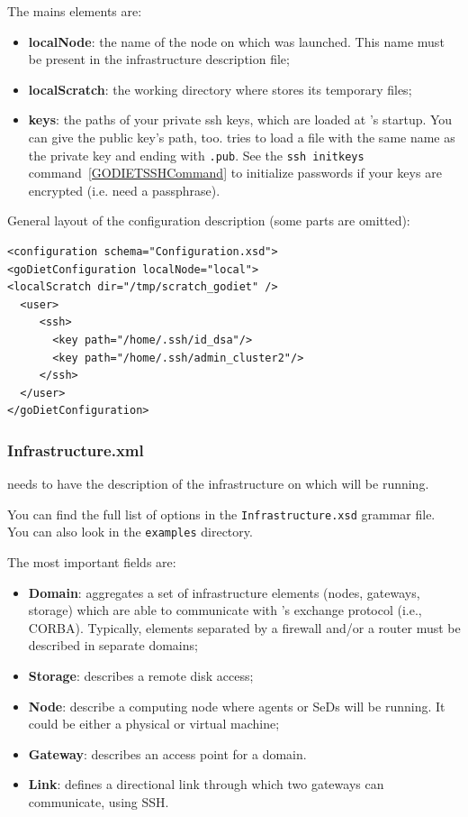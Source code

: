 \vspace{1cm}
The mains elements are:
\begin{itemize}
\item \textbf{localNode}: the name of the node on which \godiet was launched. This name must be present in the infrastructure description file;
\item \textbf{localScratch}: the working directory where \godiet stores its temporary files;
\item \textbf{keys}: the paths of your private ssh keys, which are loaded at \godiet's startup. You can give the public key's path, too. \godiet tries to load a file with the same name as the private key and ending with \verb+.pub+. See the \verb+ssh initkeys+ command~\ref{GODIETSSHCommand} to initialize passwords if your keys are encrypted (i.e. need a passphrase).
\end{itemize}

\vspace{1cm}
General layout of the configuration description (some parts are omitted):
\begin{verbatim}
<configuration schema="Configuration.xsd">
<goDietConfiguration localNode="local">
<localScratch dir="/tmp/scratch_godiet" />
  <user>
     <ssh>
       <key path="/home/.ssh/id_dsa"/>
       <key path="/home/.ssh/admin_cluster2"/>
     </ssh>
  </user>
</goDietConfiguration>
\end{verbatim}

\subsubsection{Infrastructure.xml}
\label{GODIETInfrastructureDescription}

\godiet needs to have the description of the infrastructure on which \diet will be running. 

\vspace{1cm}
You can find the full list of options in the \verb+Infrastructure.xsd+ grammar file. You can also look in the \verb+examples+ directory.

The most important fields are:
\begin{itemize}
\item \textbf{Domain}: aggregates a set of infrastructure elements (nodes, gateways, storage) which are able to communicate with \diet's exchange protocol (i.e., CORBA). Typically, elements separated by a firewall and/or a router must be described in separate domains;
\item \textbf{Storage}: describes a remote disk access;
\item \textbf{Node}: describe a computing node where agents or SeDs will be running. It could be either a physical or virtual machine;
\item \textbf{Gateway}: describes an access point for a domain.
\item \textbf{Link}: defines a directional link through which two gateways can communicate, using SSH.
\end{itemize}


